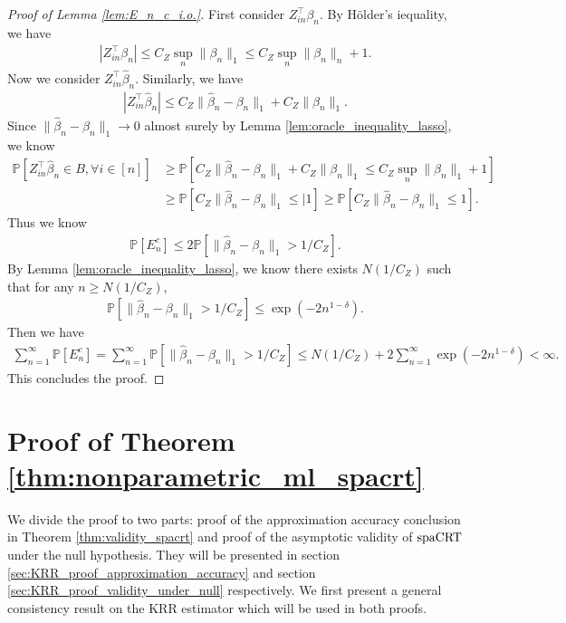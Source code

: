 \documentclass[12pt]{article}
\theoremstyle{definition}
\def\P{\mathbb{P}}
\def\P{\mathbb{P}}
\renewcommand{\P}{\mathbb{P}}							%
\newcommand{\srz}{Z}									%
\newcommand{\spacrt}{\textnormal{spaCRT}}               %
\begin{document}
\begin{proof}[Proof of Lemma \ref{lem:E_n_c_i.o.}]
  First consider $\srz_{in}^\top\beta_n$. By H\"older's iequality, we have
  \begin{align*}
    |\srz_{in}^\top\beta_n|\leq C_Z\sup_n\|\beta_n\|_1\leq C_Z\sup_n\|\beta_n\|_n+1.
  \end{align*}
  Now we consider $Z_{in}^\top \widehat{\beta}_n$. Similarly, we have 
  \begin{align*}
    |\srz_{in}^\top\widehat{\beta}_n|\leq C_Z\|\widehat{\beta}_n-\beta_n\|_1+C_Z\|\beta_n\|_1.
  \end{align*}
  Since $\|\widehat{\beta}_n-\beta_n\|_1\rightarrow 0$ almost surely by Lemma \ref{lem:oracle_inequality_lasso}, we know 
  \begin{align*}
    \P[\srz_{in}^\top\widehat{\beta}_n\in B,\forall i\in [n]]
    &
    \geq \P[C_Z\|\widehat{\beta}_n-\beta_n\|_1+C_Z\|\beta_n\|_1\leq C_Z\sup_n\|\beta_n\|_1+1]\\
    &
    \geq \P[C_Z\|\widehat{\beta}_n-\beta_n\|_1\leq|1]\geq \P[C_Z\|\widehat{\beta}_n-\beta_n\|_1\leq 1].
  \end{align*}
  Thus we know 
  \begin{align*}
    \P[E_n^c]\leq 2\P[\|\widehat{\beta}_n-\beta_n\|_1>1/C_Z].
  \end{align*}
  By Lemma \ref{lem:oracle_inequality_lasso}, we know there exists $N(1/C_Z)$ such that for any $n\geq N(1/C_Z)$,
  \begin{align*}
    \P[\|\widehat{\beta}_n-\beta_n\|_1>1/C_Z]\leq \exp(-2n^{1-\delta}).
  \end{align*}
  Then we have
  \begin{align*}
    \sum_{n=1}^{\infty}\P[E_n^c]=\sum_{n=1}^{\infty}\P[\|\widehat{\beta}_n-\beta_n\|_1>1/C_Z]\leq N(1/C_Z) + 2\sum_{n=1}^{\infty}\exp(-2n^{1-\delta})<\infty.
  \end{align*}
  This concludes the proof.
\end{proof}




\section{Proof of Theorem \ref{thm:nonparametric_ml_spacrt}}\label{sec:KRR_proof}

We divide the proof to two parts: proof of the approximation accuracy conclusion in Theorem \ref{thm:validity_spacrt} and proof of the asymptotic validity of $\spacrt$ under the null hypothesis. They will be presented in section \ref{sec:KRR_proof_approximation_accuracy} and section \ref{sec:KRR_proof_validity_under_null} respectively. We first present a general consistency result on the KRR estimator which will be used in both proofs.
\end{document}
